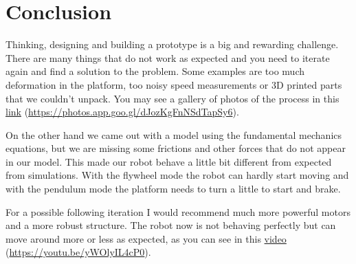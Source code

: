 \section{Conclusion}
Thinking, designing and building a prototype is a big and rewarding challenge.
There are many things that do not work as expected and you need to iterate again
and find a solution to the problem. Some examples are too much deformation in the platform,
too noisy speed measurements or 3D printed parts that we couldn't unpack. You may see a gallery of photos
of the process in this \href{https://photos.app.goo.gl/dJozKgFnNSdTapSy6}{link} (\href{https://photos.app.goo.gl/dJozKgFnNSdTapSy6}{https://photos.app.goo.gl/dJozKgFnNSdTapSy6}).

On the other hand we came out with a model using the fundamental mechanics equations, but we are missing
some frictions and other forces that do not appear in our model. This made our robot behave a little bit
different from expected from simulations. With the flywheel mode the robot can hardly start moving and with
the pendulum mode the platform needs to turn a little to start and brake.

For a possible following iteration I would recommend much more powerful motors and a more robust structure.
The robot now is not behaving perfectly but can move around more or less as expected, as you can see in this
\href{https://youtu.be/yWOlyIL4cP0}{video} (\href{https://youtu.be/yWOlyIL4cP0}{https://youtu.be/yWOlyIL4cP0}).